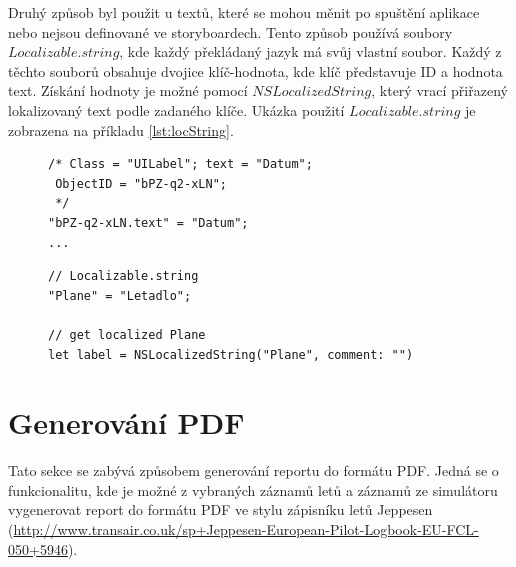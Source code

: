 \documentclass[thesis=M,czech]{FITthesis}[2012/06/26]
\begin{document}
Druhý způsob byl použit u textů, které se mohou měnit po spuštění aplikace nebo nejsou definované ve storyboardech. Tento způsob používá soubory $Localizable.string$, kde každý překládaný jazyk má svůj vlastní soubor. Každý z těchto souborů obsahuje dvojice klíč-hodnota, kde klíč představuje ID a hodnota text. Získání hodnoty je možné pomocí $NSLocalizedString$, který vrací přiřazený lokalizovaný text podle zadaného klíče. Ukázka použití $Localizable.string$ je zobrazena na příkladu \ref{lst:locString}.

\begin{figure}
\begin{minipage}{\linewidth}
\begin{lstlisting}[caption={Ukázka přípravy storyboardu pro překlad},label={lst:storyboardLoc}]
/* Class = "UILabel"; text = "Datum";
 ObjectID = "bPZ-q2-xLN";
 */
"bPZ-q2-xLN.text" = "Datum";
...
\end{lstlisting}
\end{minipage}
\end{figure}

\begin{figure}
\begin{minipage}{\linewidth}
\begin{lstlisting}[caption={Ukázka použití $Localizable.string$},label={lst:locString}]
// Localizable.string
"Plane" = "Letadlo";

// get localized Plane
let label = NSLocalizedString("Plane", comment: "")
\end{lstlisting}
\end{minipage}
\end{figure}

\section{Generování PDF}
Tato sekce se zabývá způsobem generování reportu do formátu PDF. Jedná se o funkcionalitu, kde je možné z vybraných záznamů letů a záznamů ze simulátoru vygenerovat report do formátu PDF ve stylu zápisníku letů Jeppesen (\url{http://www.transair.co.uk/sp+Jeppesen-European-Pilot-Logbook-EU-FCL-050+5946}).
\end{document}

